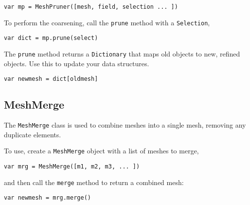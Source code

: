 \begin{lstlisting}
var mp = MeshPruner([mesh, field, selection ... ])
\end{lstlisting}

To perform the coarsening, call the \texttt{prune} method with a
\texttt{Selection},

\begin{lstlisting}
var dict = mp.prune(select)
\end{lstlisting}

The \texttt{prune} method returns a \texttt{Dictionary} that maps old
objects to new, refined objects. Use this to update your data
structures.

\begin{lstlisting}
var newmesh = dict[oldmesh]
\end{lstlisting}

\hypertarget{meshmerge}{%
\subsection{MeshMerge}\label{meshmerge}}

The \texttt{MeshMerge} class is used to combine meshes into a single
mesh, removing any duplicate elements.

To use, create a \texttt{MeshMerge} object with a list of meshes to
merge,

\begin{lstlisting}
var mrg = MeshMerge([m1, m2, m3, ... ])
\end{lstlisting}

and then call the \texttt{merge} method to return a combined mesh:

\begin{lstlisting}
var newmesh = mrg.merge()
\end{lstlisting}
